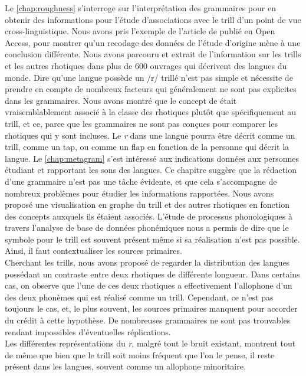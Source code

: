 Le \autoref{chap:roughness} s'interroge sur l'interprétation des grammaires pour en obtenir des informations pour l'étude d'associations avec le trill d'un point de vue cross-linguistique. Nous avons pris l'exemple de l'article de \textcite{winterTrilledAssociatedRoughness2022} publié en Open Access, pour montrer qu'un recodage des données de l'étude d'origine mène à une conclusion différente. Nous avons parcouru et extrait de l'information sur les trills et les autres rhotiques dans plus de 600 ouvrages qui décrivent des langues du monde. Dire qu'une langue possède un /r/ trillé n'est pas simple et nécessite de prendre en compte de nombreux facteurs qui généralement ne sont pas explicites dans les grammaires. Nous avons montré que le concept de  était vraisemblablement associé à la classe des rhotiques plutôt que spécifiquement au trill, et ce, parce que les grammaires ne sont pas conçues pour comparer les rhotiques qui y sont incluses. Le \textit{r} dans une langue pourra être décrit comme un trill, comme un tap, ou comme un flap en fonction de la personne qui décrit la langue. Le \autoref{chap:metagram} s'est intéressé aux indications données aux personnes étudiant et rapportant les sons des langues. Ce chapitre suggère que la rédaction d'une grammaire n'est pas une tâche évidente, et que cela s'accompagne de nombreux problèmes pour étudier les informations rapportées. Nous avons proposé une visualisation en graphe du trill et des autres rhotiques en fonction des concepts auxquels ils étaient associés. L'étude de processus phonologiques à travers l'analyse de base de données phonémiques nous a permis de dire que le symbole pour le trill est souvent présent même si sa réalisation n'est pas possible. Ainsi, il faut contextualiser les sources primaires.\\

Cherchant les trills, nous avons proposé de regarder la distribution des langues possédant un contraste entre deux rhotiques de différente longueur. Dans certains cas, on observe que l'une de ces deux rhotiques a effectivement l'allophone d'un des deux phonèmes qui est réalisé comme un trill. Cependant, ce n'est pas toujours le cas, et, le plus souvent, les sources primaires manquent pour accorder du crédit à cette hypothèse. De nombreuses grammaires ne sont pas trouvables rendant impossibles d'éventuelles réplications.\\

Les différentes représentations du \textit{r}, malgré tout le bruit existant, montrent tout de même que bien que le trill soit moins fréquent que l'on le pense, il reste présent dans les langues, souvent comme un allophone minoritaire.

